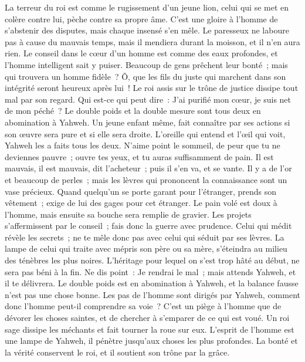 \begin{multicols}{2}
La terreur du roi est comme le rugissement d'un jeune lion, celui qui se met en colère contre lui, pèche contre sa propre âme.
C'est une gloire à l'homme de s'abstenir des disputes, mais chaque insensé s'en mêle.
Le paresseux ne laboure pas à cause du mauvais temps, mais il mendiera durant la moisson, et il n'en aura rien.
Le conseil dans le cœur d'un homme est comme des eaux profondes, et l'homme intelligent sait y puiser.
Beaucoup de gens prêchent leur bonté~; mais qui trouvera un homme fidèle~?
Ô, que les fils du juste qui marchent dans son intégrité seront heureux après lui~!
Le roi assis sur le trône de justice dissipe tout mal par son regard.
Qui est-ce qui peut dire~: J'ai purifié mon cœur, je suis net de mon péché~?
Le double poids et la double mesure sont tous deux en abomination à Yahweh.
Un jeune enfant même, fait connaître par ses actions si son œuvre sera pure et si elle sera droite.
L'oreille qui entend et l'œil qui voit, Yahweh les a faits tous les deux.
N'aime point le sommeil, de peur que tu ne deviennes pauvre~; ouvre tes yeux, et tu auras suffisamment de pain.
Il est mauvais, il est mauvais, dit l'acheteur~; puis il s'en va, et se vante.
Il y a de l'or et beaucoup de perles~; mais les lèvres qui prononcent la connaissance sont un vase précieux.
Quand quelqu'un se porte garant pour l'étranger, prends son vêtement~; exige de lui des gages pour cet étranger.
Le pain volé est doux à l'homme, mais ensuite sa bouche sera remplie de gravier.
Les projets s'affermissent par le conseil~; fais donc la guerre avec prudence.
Celui qui médit révèle les secrets~; ne te mêle donc pas avec celui qui séduit par ses lèvres.
La lampe de celui qui traite avec mépris son père ou sa mère, s'éteindra au milieu des ténèbres les plus noires.
L'héritage pour lequel on s'est trop hâté au début, ne sera pas béni à la fin.
Ne dis point~: Je rendrai le mal~; mais attends Yahweh, et il te délivrera.
Le double poids est en abomination à Yahweh, et la balance fausse n'est pas une chose bonne.
Les pas de l'homme sont dirigés par Yahweh, comment donc l'homme peut-il comprendre sa voie~?
C'est un piège à l'homme que de dévorer les choses saintes, et de chercher à s'emparer de ce qui est voué.
Un roi sage dissipe les méchants et fait tourner la roue sur eux.
L'esprit de l'homme est une lampe de Yahweh, il pénètre jusqu'aux choses les plus profondes.
La bonté et la vérité conservent le roi, et il soutient son trône par la grâce.

\end{multicols}
